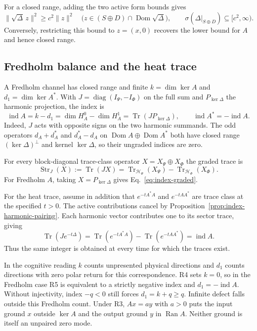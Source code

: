 \documentclass[11pt]{article}
\theoremstyle{definition}
\DeclareMathOperator{\Ran}{Ran}
\DeclareMathOperator{\Tr}{Tr}
\begin{document}
For a closed range, adding the two active form bounds gives
\begin{equation}
 \|\sqrt\Delta\, z\|^2\ge c^2\|z\|^2
 \quad\bigl(z\in(S\oplus D)\cap\operatorname{Dom}\sqrt\Delta\bigr),
 \qquad \sigma(\Delta|_{S\oplus D})\subseteq[c^2,\infty).
 \label{eq:active-laplacian-gap}
\end{equation}
Conversely, restricting this bound to $z=(x,0)$ recovers the lower bound for $A$ and hence closed range.

\subsection{Fredholm balance and the heat trace}

A Fredholm channel has closed range and finite $k=\dim\ker A$ and $d_1=\dim\ker A^*$. With $J=\operatorname{diag}(I_\Psi,-I_\Phi)$ on the full sum and $P_{\ker\Delta}$ the harmonic projection, the index is
\begin{equation}
 \operatorname{ind} A=k-d_1=\dim H^0_A-\dim H^1_A
     =\Tr(JP_{\ker\Delta}),\qquad \operatorname{ind}A^*=-\operatorname{ind}A .
 \label{eq:index-graded}
\end{equation}
Indeed, $J$ acts with opposite signs on the two harmonic summands. The odd operators $d_A+d_A^*$ and $d_A^*-d_A$ on $\operatorname{Dom}A\oplus\operatorname{Dom}A^*$ both have closed range $(\ker\Delta)^\perp$ and kernel $\ker\Delta$, so their ungraded indices are zero.

For every block-diagonal trace-class operator $X=X_\Psi\oplus X_\Phi$ the graded trace is
\begin{equation}
 \operatorname{Str}_J(X):=\Tr(JX)=\Tr_{\mathcal H_\Psi}(X_\Psi)-\Tr_{\mathcal H_\Phi}(X_\Phi).
 \label{eq:graded-trace-general}
\end{equation}
For Fredholm $A$, taking $X=P_{\ker\Delta}$ gives Eq.~\eqref{eq:index-graded}.

For the heat trace, assume in addition that $e^{-tA^*A}$ and $e^{-tAA^*}$ are trace class at the specified $t>0$. The active contributions cancel by Proposition~\ref{prop:index-harmonic-pairing}. Each harmonic vector contributes one to its sector trace, giving
\begin{equation}
 \Tr(J e^{-t\Delta})=\Tr(e^{-tA^*A})-\Tr(e^{-tAA^*})=\operatorname{ind}A .
 \label{eq:index-heat}
\end{equation}
Thus the same integer is obtained at every time for which the traces exist.

In the cognitive reading $k$ counts unpresented physical directions and $d_1$ counts directions with zero polar return for this correspondence. R4 sets $k=0$, so in the Fredholm case R5 is equivalent to a strictly negative index and $d_1=-\operatorname{ind}A$. Without injectivity, index $-q<0$ still forces $d_1=k+q\ge q$. Infinite defect falls outside this Fredholm count. Under R3, $Ax=a y$ with $a>0$ puts the input ground $x$ outside $\ker A$ and the output ground $y$ in $\Ran A$. Neither ground is itself an unpaired zero mode.
\end{document}
